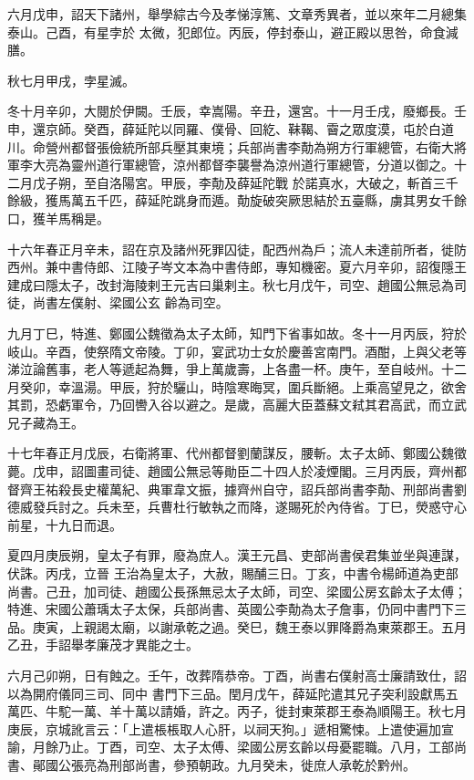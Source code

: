 \begin{pinyinscope}
 六月戊申，詔天下諸州，舉學綜古今及孝悌淳篤、文章秀異者，並以來年二月總集泰山。己酉，有星孛於
 太微，犯郎位。丙辰，停封泰山，避正殿以思咎，命食減膳。



 秋七月甲戌，孛星滅。



 冬十月辛卯，大閱於伊闕。壬辰，幸嵩陽。辛丑，還宮。十一月壬戌，廢鄉長。壬申，還京師。癸酉，薛延陀以同羅、僕骨、回紇、靺鞨、霫之眾度漠，屯於白道川。命營州都督張儉統所部兵壓其東境；兵部尚書李勣為朔方行軍總管，右衛大將軍李大亮為靈州道行軍總管，涼州都督李襲譽為涼州道行軍總管，分道以御之。十二月戊子朔，至自洛陽宮。甲辰，李勣及薛延陀戰
 於諾真水，大破之，斬首三千餘級，獲馬萬五千匹，薛延陀跳身而遁。勣旋破突厥思結於五臺縣，虜其男女千餘口，獲羊馬稱是。



 十六年春正月辛未，詔在京及諸州死罪囚徒，配西州為戶；流人未達前所者，徙防西州。兼中書侍郎、江陵子岑文本為中書侍郎，專知機密。夏六月辛卯，詔復隱王建成曰隱太子，改封海陵剌王元吉曰巢剌主。秋七月戊午，司空、趙國公無忌為司徒，尚書左僕射、梁國公玄
 齡為司空。



 九月丁巳，特進、鄭國公魏徵為太子太師，知門下省事如故。冬十一月丙辰，狩於岐山。辛酉，使祭隋文帝陵。丁卯，宴武功士女於慶善宮南門。酒酣，上與父老等涕泣論舊事，老人等遞起為舞，爭上萬歲壽，上各盡一杯。庚午，至自岐州。十二月癸卯，幸溫湯。甲辰，狩於驪山，時陰寒晦冥，圍兵斷絕。上乘高望見之，欲舍其罰，恐虧軍令，乃回轡入谷以避之。是歲，高麗大臣蓋蘇文弒其君高武，而立武兄子藏為王。



 十七年春正月戊辰，右衛將軍、代州都督劉蘭謀反，腰斬。太子太師、鄭國公魏徵薨。戊申，詔圖畫司徒、趙國公無忌等勛臣二十四人於凌煙閣。三月丙辰，齊州都督齊王祐殺長史權萬紀、典軍韋文振，據齊州自守，詔兵部尚書李勣、刑部尚書劉德威發兵討之。兵未至，兵曹杜行敏執之而降，遂賜死於內侍省。丁巳，熒惑守心前星，十九日而退。



 夏四月庚辰朔，皇太子有罪，廢為庶人。漢王元昌、吏部尚書侯君集並坐與連謀，伏誅。丙戌，立晉
 王治為皇太子，大赦，賜酺三日。丁亥，中書令楊師道為吏部尚書。己丑，加司徒、趙國公長孫無忌太子太師，司空、梁國公房玄齡太子太傅；特進、宋國公蕭瑀太子太保，兵部尚書、英國公李勣為太子詹事，仍同中書門下三品。庚寅，上親謁太廟，以謝承乾之過。癸巳，魏王泰以罪降爵為東萊郡王。五月乙丑，手詔舉孝廉茂才異能之士。



 六月己卯朔，日有蝕之。壬午，改葬隋恭帝。丁酉，尚書右僕射高士廉請致仕，詔以為開府儀同三司、同中
 書門下三品。閏月戊午，薛延陀遣其兄子突利設獻馬五萬匹、牛駝一萬、羊十萬以請婚，許之。丙子，徙封東萊郡王泰為順陽王。秋七月庚辰，京城訛言云：「上遣棖棖取人心肝，以祠天狗。」遞相驚悚。上遣使遍加宣諭，月餘乃止。丁酉，司空、太子太傅、梁國公房玄齡以母憂罷職。八月，工部尚書、鄖國公張亮為刑部尚書，參預朝政。九月癸未，徙庶人承乾於黔州。




\end{pinyinscope}
